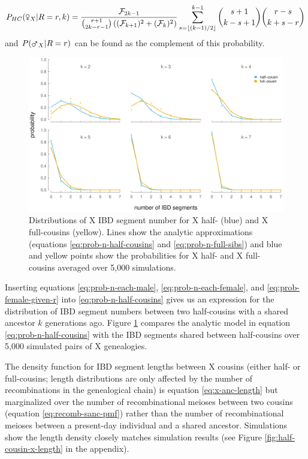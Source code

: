 \documentclass[11pt]{article}
\newcommand{\msxa}{\mars_X}
\newcommand{\fsxa}{\venus_X}
\begin{document}
\begin{equation}
  \label{eq:prob-female-given-r}
  P_{HC}(\fsxa | R=r, k) = \frac{\mathcal{F}_{2k-1} }{ { r+1 \choose 2k-r-1 }  \left( (\mathcal{F}_{k+1})^2 + (\mathcal{F}_k)^2 \right) }
\sum_{s=\lfloor (k-1)/2 \rfloor}^{k-1}  {s + 1 \choose k - s + 1 } { r - s \choose k + s - r }
\end{equation}
%
and $P(\msxa | R=r)$ can be found as the complement of this probability.

\begin{figure}[!ht]
  \centering

  \includegraphics[width=\textwidth]{images/x-full-half-blockcounts}

  \caption{Distributions of X IBD segment number for X half- (blue) and X
full-cousins (yellow). Lines show the analytic approximations (equations
\eqref{eq:prob-n-half-cousins} and \eqref{eq:prob-n-full-sibs}) and blue and
yellow points show the probabilities for X half- and X full-cousins averaged
over 5,000 simulations.}

  \label{fig:half-cousin-segment-number}
\end{figure}

Inserting equations \eqref{eq:prob-n-each-male}, \eqref{eq:prob-n-each-female},
and \eqref{eq:prob-female-given-r} into \eqref{eq:prob-n-half-cousins} gives us
an expression for the distribution of IBD segment numbers between two
half-cousins with a shared ancestor $k$ generations ago. Figure
\ref{fig:half-cousin-segment-number} compares the analytic model in equation
\eqref{eq:prob-n-half-cousins} with the IBD segments shared between
half-cousins over 5,000 simulated pairs of X genealogies.

The density function for IBD segment lengths between X cousins (either half- or
full-cousins; length distributions are only affected by the number of
recombinations in the genealogical chain) is equation \eqref{eq:x-anc-length}
but marginalized over the number of recombinational meioses between two cousins
(equation \eqref{eq:recomb-sanc-pmf}) rather than the number of recombinational
meioses between a present-day individual and a shared ancestor. Simulations
show the length density closely matches simulation results (see Figure
\ref{fig:half-cousin-x-length} in the appendix).
\end{document}
